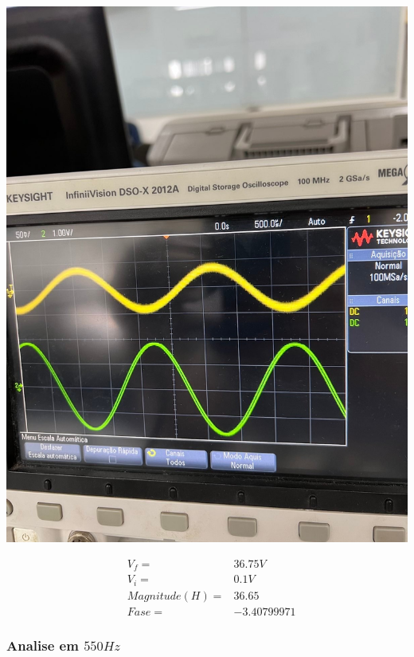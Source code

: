 \documentclass[12pt,twoside, a4paper, twocolumn]{article}
\begin{document}
\begin{adjustbox}{scale=0.18}
    \includegraphics{freq480.jpeg}
\end{adjustbox}

\begin{equation*}
    \begin{aligned}
         & V_f =          & 36.75V      \\
         & V_i =          & 0.1V        \\
         & Magnitude(H) = & 36.65       \\
         & Fase =         & -3.40799971
    \end{aligned}
\end{equation*}

\subsubsection{Analise em $550Hz$}
\subparagraph*{}
\end{document}
